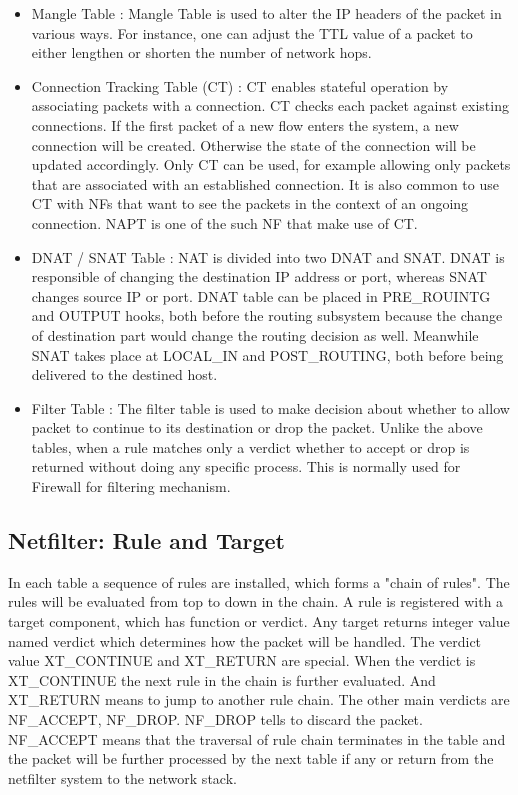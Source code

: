 \begin{itemize}
	\item Mangle Table : Mangle Table is used to alter the IP headers of the packet in various ways. For instance, one can adjust the TTL value of a packet to either lengthen or shorten the number of network hops. 
	\item Connection Tracking Table (CT) : CT enables stateful operation by associating packets with a connection. CT checks each packet against existing connections. If the first packet of a new flow enters the system, a new connection will be created. Otherwise the state of the connection will be updated accordingly. Only CT can be used, for example allowing only packets that are associated with an established connection. It is also common to use CT with NFs that want to see the packets in the context of an ongoing connection. NAPT is one of the such NF that make use of CT.
	\item DNAT / SNAT Table : NAT is divided into two DNAT and SNAT. DNAT is responsible of changing the destination IP address or port, whereas SNAT changes source IP or port. DNAT table can be placed in PRE\_ROUINTG and OUTPUT hooks, both before the routing subsystem because the change of destination part would change the routing decision as well. Meanwhile SNAT takes place at LOCAL\_IN and POST\_ROUTING, both before being delivered to the destined host. 
	\item Filter Table : The filter table is used to make decision about whether to allow packet to continue to its destination or drop the packet. Unlike the above tables, when a rule matches only a verdict whether to accept or drop is returned without doing any specific process. This is normally used for Firewall for filtering mechanism. 
\end{itemize}
 


\subsection{Netfilter: Rule and Target}
In each table a sequence of rules are installed, which forms a "chain of rules". The rules will be evaluated from top to down in the chain. A rule is registered with a target component, which has function or verdict. Any target returns integer value named verdict which determines how the packet will be handled.
 The verdict value XT\_CONTINUE and XT\_RETURN are special. When the verdict is XT\_CONTINUE the next rule in the chain is further evaluated. And XT\_RETURN means to jump to another rule chain. The other main verdicts are NF\_ACCEPT, NF\_DROP. NF\_DROP tells to discard the packet. NF\_ACCEPT means that the traversal of rule chain terminates in the table and the packet will be further processed by the next table if any or return from the netfilter system to the network stack. 
 

